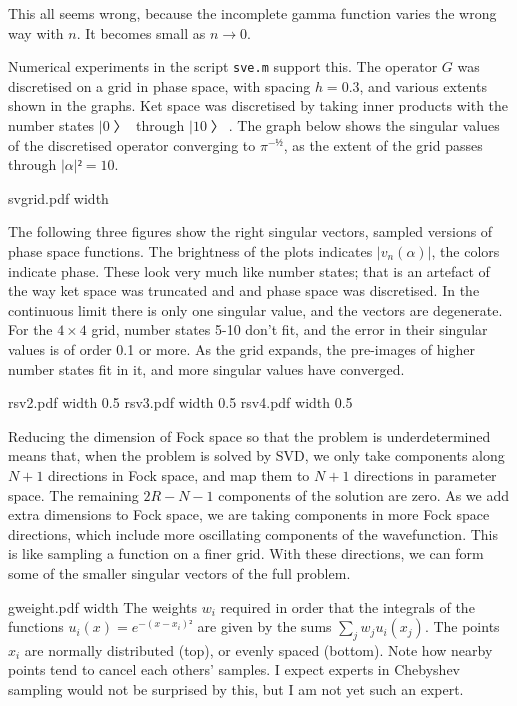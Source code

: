 This all seems wrong, because the incomplete gamma function varies the wrong way with $n$.  It becomes small as $n→0$.

Numerical experiments in the script {\tt sve.m} support this.  The operator $G$ was discretised on a grid in phase space, with spacing $h=0.3$, and various extents shown in the graphs.  Ket space was discretised by taking inner products with the number states $|0〉$ through $|10〉$.  The graph below shows the singular values of the discretised operator converging to $π^{-½}$, as the extent of the grid passes through $|α|²=10$.

\topinsert \XeTeXpicfile svgrid.pdf width \hsize \endinsert

The following three figures show the right singular vectors, sampled versions of phase space functions.  The brightness of the plots indicates $|v_n(α)|$, the colors indicate phase.  These look very much like number states; that is an artefact of the way ket space was truncated and and phase space was discretised.  In the continuous limit there is only one singular value, and the vectors are degenerate.  For the $4×4$ grid, number states 5-10 don't fit, and the error in their singular values is of order 0.1 or more.  As the grid expands, the pre-images of higher number states fit in it, and more singular values have converged.

\topinsert \XeTeXpicfile rsv2.pdf width 0.5\hsize
\XeTeXpicfile rsv3.pdf width 0.5\hsize \endinsert
\topinsert \XeTeXpicfile rsv4.pdf width 0.5\hsize \endinsert

Reducing the dimension of Fock space so that the problem is underdetermined means that, when the problem is solved by SVD, we only take components along $N+1$ directions in Fock space, and map them to $N+1$ directions in parameter space.  The remaining $2R-N-1$ components of the solution are zero.  As we add extra dimensions to Fock space, we are taking components in more Fock space directions, which include more oscillating components of the wavefunction.  This is like sampling a function on a finer grid.  With these directions, we can form some of the smaller singular vectors of the full problem.


\topinsert \XeTeXpicfile gweight.pdf width \hsize 
The weights $w_i$ required in order that the integrals of the functions $u_i(x)=e^{-(x-x_i)²}$ are given by the sums $∑_j w_j u_i(x_j)$.  The points $x_i$ are normally distributed (top), or evenly spaced (bottom).  Note how nearby points tend to cancel each others' samples.  I expect experts in Chebyshev sampling would not be surprised by this, but I am not yet such an expert.

